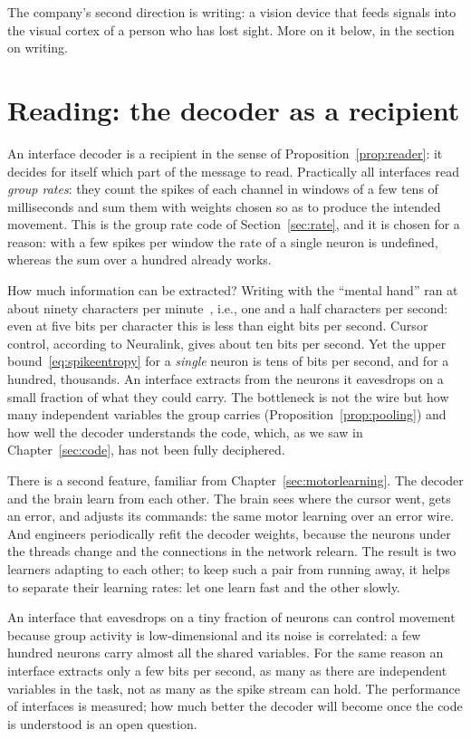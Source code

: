 The company's second direction is writing: a vision device that feeds signals into the visual cortex of a person who has lost sight. More on it below, in the section on writing.

\section{Reading: the decoder as a recipient}

An interface decoder is a recipient in the sense of Proposition~\ref{prop:reader}: it decides for itself which part of the message to read. Practically all interfaces read \emph{group rates}: they count the spikes of each channel in windows of a few tens of milliseconds and sum them with weights chosen so as to produce the intended movement. This is the group rate code of Section~\ref{sec:rate}, and it is chosen for a reason: with a few spikes per window the rate of a single neuron is undefined, whereas the sum over a hundred already works.

How much information can be extracted? Writing with the ``mental hand'' ran at about ninety characters per minute~\cite{Willett2021}, i.e., one and a half characters per second: even at five bits per character this is less than eight bits per second. Cursor control, according to Neuralink, gives about ten bits per second. Yet the upper bound~\eqref{eq:spikeentropy} for a \emph{single} neuron is tens of bits per second, and for a hundred, thousands. An interface extracts from the neurons it eavesdrops on a small fraction of what they could carry. The bottleneck is not the wire but how many independent variables the group carries (Proposition~\ref{prop:pooling}) and how well the decoder understands the code, which, as we saw in Chapter~\ref{sec:code}, has not been fully deciphered.

There is a second feature, familiar from Chapter~\ref{sec:motorlearning}. The decoder and the brain learn from each other. The brain sees where the cursor went, gets an error, and adjusts its commands: the same motor learning over an error wire. And engineers periodically refit the decoder weights, because the neurons under the threads change and the connections in the network relearn. The result is two learners adapting to each other; to keep such a pair from running away, it helps to separate their learning rates: let one learn fast and the other slowly.

\begin{keyblock}
\begin{proposition}
\label{prop:probe}
An interface that eavesdrops on a tiny fraction of neurons can control movement because group activity is low-dimensional and its noise is correlated: a few hundred neurons carry almost all the shared variables. For the same reason an interface extracts only a few bits per second, as many as there are independent variables in the task, not as many as the spike stream can hold. The performance of interfaces is measured; how much better the decoder will become once the code is understood is an open question.
\end{proposition}
\end{keyblock}

